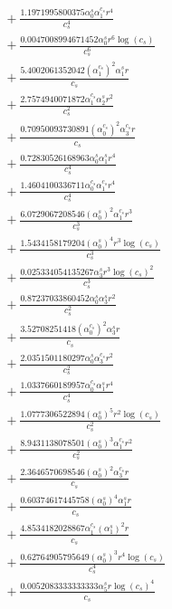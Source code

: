 \documentclass[10pt]{article}
\begin{document}
\begin{align*}
&{}  + \frac{1.1971995800375 \alpha_{0}^s \alpha_{1}^{c_s} r^{4}}{c_{s}^{4}} \\
&{}  + \frac{0.0047008994671452 \alpha_{0}^s r^{6} \log{\left(c_{s} \right)}}{c_{s}^{6}} \\
&{}  + \frac{5.4002061352042 \left(\alpha_{1}^{c_s}\right)^{2} \alpha_{1}^s r}{c_{s}} \\
&{}  + \frac{2.7574940071872 \alpha_{1}^{c_s} \alpha_{2}^s r^{2}}{c_{s}^{2}} \\
&{}  + \frac{0.70950093730891 \left(\alpha_{0}^{c_s}\right)^{2} \alpha_{3}^{c_s} r}{c_{s}} \\
&{}  + \frac{0.72830526168963 \alpha_{0}^s \alpha_{1}^s r^{4}}{c_{s}^{4}} \\
&{}  + \frac{1.4604100336711 \alpha_{0}^{c_s} \alpha_{1}^{c_s} r^{4}}{c_{s}^{4}} \\
&{}  + \frac{6.0729067208546 \left(\alpha_{0}^s\right)^{2} \alpha_{1}^{c_s} r^{3}}{c_{s}^{3}} \\
&{}  + \frac{1.5434158179204 \left(\alpha_{0}^s\right)^{4} r^{3} \log{\left(c_{s} \right)}}{c_{s}^{3}} \\
&{}  + \frac{0.025334054135267 \alpha_{3}^s r^{3} \log{\left(c_{s} \right)}^{2}}{c_{s}^{3}} \\
&{}  + \frac{0.87237033860452 \alpha_{0}^s \alpha_{3}^s r^{2}}{c_{s}^{2}} \\
&{}  + \frac{3.52708251418 \left(\alpha_{0}^{c_s}\right)^{2} \alpha_{3}^s r}{c_{s}} \\
&{}  + \frac{2.0351501180297 \alpha_{0}^s \alpha_{3}^{c_s} r^{2}}{c_{s}^{2}} \\
&{}  + \frac{1.0337660189957 \alpha_{0}^{c_s} \alpha_{1}^s r^{4}}{c_{s}^{4}} \\
&{}  + \frac{1.0777306522894 \left(\alpha_{0}^s\right)^{5} r^{2} \log{\left(c_{s} \right)}}{c_{s}^{2}} \\
&{}  + \frac{8.9431138078501 \left(\alpha_{0}^s\right)^{3} \alpha_{1}^{c_s} r^{2}}{c_{s}^{2}} \\
&{}  + \frac{2.3646570698546 \left(\alpha_{0}^s\right)^{2} \alpha_{3}^{c_s} r}{c_{s}} \\
&{}  + \frac{0.60374617445758 \left(\alpha_{0}^s\right)^{4} \alpha_{1}^s r}{c_{s}} \\
&{}  + \frac{4.8534182028867 \alpha_{1}^{c_s} \left(\alpha_{1}^s\right)^{2} r}{c_{s}} \\
&{}  + \frac{0.62764905795649 \left(\alpha_{0}^s\right)^{3} r^{4} \log{\left(c_{s} \right)}}{c_{s}^{4}} \\
&{}  + \frac{0.0052083333333333 \alpha_{5}^s r \log{\left(c_{s} \right)}^{4}}{c_{s}} \\

\end{align*}
\end{document}
